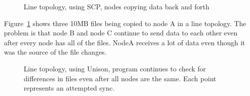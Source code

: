 \documentclass[12pt]{article}
\begin{document}
\begin{figure}[htp]
    \caption{Line topology, using SCP, nodes copying data back and forth}
    \label{fig:line_scp_back_forth_graph}
\end{figure}

Figure~\ref{fig:line_scp_back_forth_graph} shows three 10MB files being copied to node A
in a line topology. The problem is that node B and node C continue to send
data to each other even after every node has all of the files. NodeA receives
a lot of data even though it was the source of the file changes. 

\begin{figure}[htp]
    \caption{Line topology, using Unison, program continues to check
    for differences in files even after all nodes are the same.
    Each point represents an attempted sync.}
    \label{fig:line_uni_tail_graph}
\end{figure}
\end{document}

